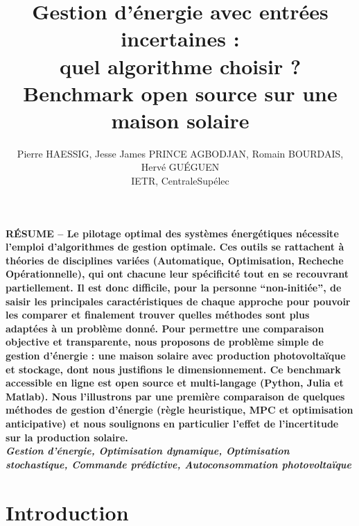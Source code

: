 \documentclass[a4paper,10pt,twocolumn]{article}
\title{
\fontsize{24pt}{24pt}\selectfont
Gestion d'énergie avec entrées incertaines : \\
quel algorithme choisir ?\\
Benchmark open source sur une maison solaire
}
\author{
\fontsize{11pt}{11pt}\selectfont
Pierre HAESSIG\tsp{*}, Jesse James PRINCE AGBODJAN\tsp{*}, Romain BOURDAIS\tsp{*}, Hervé GUÉGUEN\tsp{*}\\
\fontsize{10pt}{10pt}\selectfont
\tsp{*}IETR, CentraleSupélec
}
\date{}
\begin{document}
\maketitle
\thispagestyle{fancy}


\fontsize{9pt}{9pt}\selectfont
\textbf{RÉSUME --
Le pilotage optimal des systèmes énergétiques nécessite l'emploi d'algorithmes
de gestion optimale.
Ces outils se rattachent à théories de disciplines variées (Automatique, Optimisation, Recheche Opérationnelle),
qui ont chacune leur spécificité tout en se recouvrant partiellement.
%
Il est donc difficile, pour la personne ``non-initiée'', de saisir les principales caractéristiques
de chaque approche pour pouvoir les comparer et finalement trouver
quelles méthodes sont plus adaptées à un problème donné.
%
Pour permettre une comparaison objective et transparente,
nous proposons de problème simple de gestion d'énergie : une maison solaire 
avec production photovoltaïque et stockage, dont nous justifions le dimensionnement.
Ce benchmark accessible en ligne est open source et multi-langage (Python, Julia et Matlab).
Nous l'illustrons par une première comparaison de quelques méthodes de gestion d'énergie
(règle heuristique, MPC et optimisation anticipative)
et nous soulignons en particulier l'effet de l'incertitude
sur la production solaire.
}\\

\textbf{\textit{Gestion d'énergie, Optimisation dynamique, Optimisation stochastique,
Commande prédictive, Autoconsommation photovoltaïque}}

\fontsize{10pt}{10pt}\selectfont


\section{Introduction}
\end{document}
